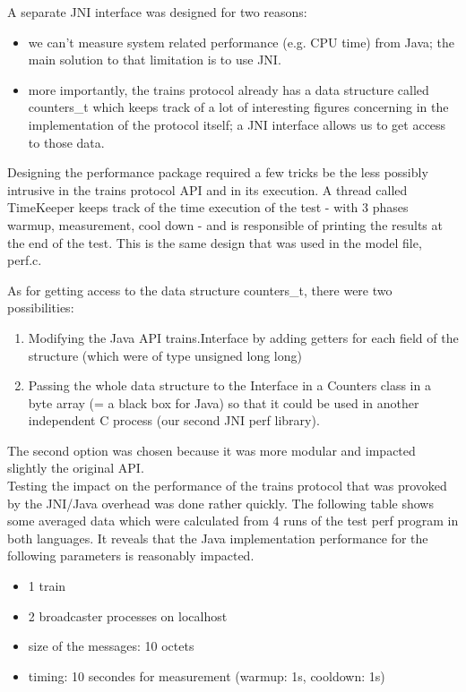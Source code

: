 \documentclass[a4paper,10pt]{report}
\begin{document}
A separate JNI  interface was designed for two reasons:
\begin{itemize}
	\item we can't measure system related performance (e.g. CPU time) from Java; the main solution to that limitation is to use JNI. 
	\item more importantly, the trains protocol already has a data structure called counters\_t which keeps track of a lot of interesting figures concerning in the implementation of the protocol itself; a JNI interface allows us to get access to those data.\\
\end{itemize}

Designing the performance package required a few tricks be the less possibly intrusive in the trains protocol API and in its execution.
A thread called TimeKeeper keeps track of the time execution of the test - with 3 phases warmup, measurement, cool down - and is responsible of printing the results at the end of the test. This is the same design that was used in the model file, perf.c.

As for getting access to the data structure counters\_t, there were two possibilities:
\begin{enumerate}
	\item Modifying the Java API trains.Interface by adding getters for each field of the structure (which were of type unsigned long long)
	\item Passing the whole data structure to the Interface in a Counters class in a byte array (= a black box for Java) so that it could be used in another independent  C process (our second JNI perf library).  
\end{enumerate} 

The second option was chosen because it was more modular and impacted slightly the original API.\\

Testing the impact on the performance of the trains protocol that was provoked by the JNI/Java overhead was done rather quickly. The following table shows some averaged data which were calculated from 4 runs of the test perf program in both languages. It reveals that the Java implementation performance for the following parameters is reasonably impacted.\\

\begin{itemize}
	\item 1 train	
	\item 2 broadcaster processes on localhost
	\item size of the messages: 10 octets
	\item timing: 10 secondes for measurement (warmup: 1s, cooldown: 1s)
\end{itemize}
\end{document}
